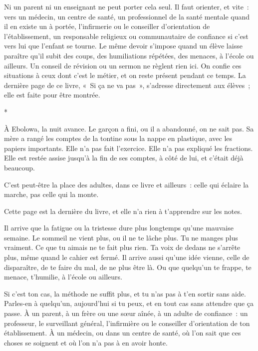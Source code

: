 \documentclass[10.5pt,twoside,openright]{book}
\newcommand{\asterisme}{\par\vspace{0.7em}\centerline{\color{gris}*\quad*\quad*}\vspace{0.7em}\par\noindent}
\newcommand{\chapitresn}[1]{\cleardoublepage\markright{#1}\thispagestyle{plain}\vspace*{2.8cm}{\noindent\LARGE\bfseries #1\par}\vspace{1.6em}\noindent\ignorespaces}
\begin{document}
Ni un parent ni un enseignant ne peut porter cela seul. Il faut orienter, et vite : vers un médecin, un centre de santé, un professionnel de la santé mentale quand il en existe un à portée, l’infirmerie ou le conseiller d’orientation de l’établissement, un responsable religieux ou communautaire de confiance si c’est vers lui que l’enfant se tourne. Le même devoir s’impose quand un élève laisse paraître qu’il subit des coups, des humiliations répétées, des menaces, à l’école ou ailleurs. Un conseil de révision ou un sermon ne règlent rien ici. On confie ces situations à ceux dont c’est le métier, et on reste présent pendant ce temps. La dernière page de ce livre, « Si ça ne va pas », s’adresse directement aux élèves ; elle est faite pour être montrée.

\asterisme

À Ebolowa, la nuit avance. Le garçon a fini, ou il a abandonné, on ne sait pas. Sa mère a rangé les comptes de la tontine sous la nappe en plastique, avec les papiers importants. Elle n’a pas fait l’exercice. Elle n’a pas expliqué les fractions. Elle est restée assise jusqu’à la fin de ses comptes, à côté de lui, et c’était déjà beaucoup.

C’est peut-être la place des adultes, dans ce livre et ailleurs : celle qui éclaire la marche, pas celle qui la monte.


\chapitresn{Si ça ne va pas}

Cette page est la dernière du livre, et elle n’a rien à t’apprendre sur les notes.

Il arrive que la fatigue ou la tristesse dure plus longtemps qu’une mauvaise semaine. Le sommeil ne vient plus, ou il ne te lâche plus. Tu ne manges plus vraiment. Ce que tu aimais ne te fait plus rien. Ta voix de dedans ne s’arrête plus, même quand le cahier est fermé. Il arrive aussi qu’une idée vienne, celle de disparaître, de te faire du mal, de ne plus être là. Ou que quelqu’un te frappe, te menace, t’humilie, à l’école ou ailleurs.

Si c’est ton cas, la méthode ne suffit plus, et tu n’as pas à t’en sortir sans aide. Parles-en à quelqu’un, aujourd’hui si tu peux, et en tout cas sans attendre que ça passe. À un parent, à un frère ou une sœur aînée, à un adulte de confiance : un professeur, le surveillant général, l’infirmière ou le conseiller d’orientation de ton établissement. À un médecin, ou dans un centre de santé, où l’on sait que ces choses se soignent et où l’on n’a pas à en avoir honte.
\end{document}
